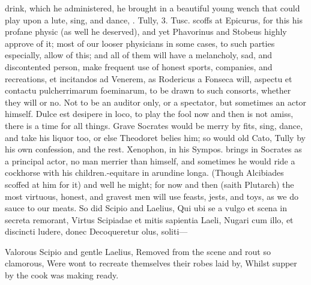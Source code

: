 {drink, which he administered, he brought in a beautiful young
wench that could play upon a lute, sing, and dance, \etc{}. Tully, 3.
Tusc. scoffs at Epicurus, for this his profane physic (as well he
deserved), and yet Phavorinus and Stobeus highly approve of it; most of
our looser physicians in some cases, to such parties especially, allow
of this; and all of them will have a melancholy, sad, and discontented
person, make frequent use of honest sports, companies, and recreations,
et incitandos ad Venerem, as Rodericus a Fonseca will, aspectu et
contactu pulcherrimarum foeminarum, to be drawn to such consorts,
whether they will or no. Not to be an auditor only, or a spectator, but
sometimes an actor himself. Dulce est desipere in loco, to play the
fool now and then is not amiss, there is a time for all things. Grave
Socrates would be merry by fits, sing, dance, and take his liquor too,
or else Theodoret belies him; so would old Cato, Tully by his own
confession, and the rest. Xenophon, in his Sympos. brings in Socrates
as a principal actor, no man merrier than himself, and sometimes he
would ride a cockhorse with his children.-equitare in arundine
longa. (Though Alcibiades scoffed at him for it) and well he might; for
now and then (saith Plutarch) the most virtuous, honest, and gravest
men will use feasts, jests, and toys, as we do sauce to our meats. So
did Scipio and Laelius,
Qui ubi se a vulgo et scena in secreta remorant,
Virtus Scipiadae et mitis sapientia Laeli,
Nugari cum illo, et discincti ludere, donec
Decoqueretur olus, soliti---

Valorous Scipio and gentle Laelius,
Removed from the scene and rout so clamorous,
Were wont to recreate themselves their robes laid by,
Whilst supper by the cook was making ready.

}
